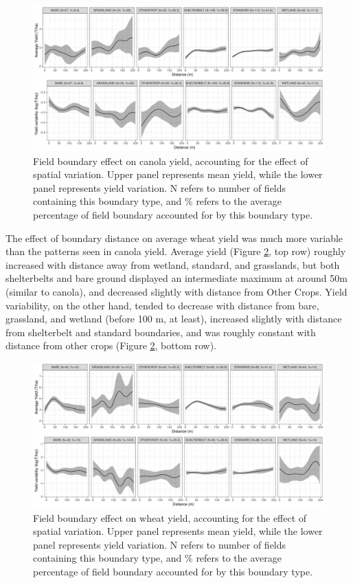 \documentclass[]{elsarticle} %
\begin{document}
\begin{figure}
\includegraphics[width=1\linewidth]{../Figures/ModelSummary3a_canola} \caption{Field boundary effect on canola yield, accounting for the effect of spatial variation. Upper panel represents mean yield, while the lower panel represents yield variation. N refers to number of fields containing this boundary type, and \% refers to the average percentage of field boundary accounted for by this boundary type.}\label{fig:canolaPlot}
\end{figure}

The effect of boundary distance on average wheat yield was much more variable than the patterns seen in canola yield.
Average yield (Figure \ref{fig:wheatPlot}, top row) roughly increased with distance away from wetland, standard, and grasslands, but both shelterbelts and bare ground displayed an intermediate maximum at around 50m (similar to canola), and decreased slightly with distance from Other Crops.
Yield variability, on the other hand, tended to decrease with distance from bare, grassland, and wetland (before 100 m, at least), increased slightly with distance from shelterbelt and standard boundaries, and was roughly constant with distance from other crops (Figure \ref{fig:wheatPlot}, bottom row).

\begin{figure}
\includegraphics[width=1\linewidth]{../Figures/ModelSummary3a_wheat} \caption{Field boundary effect on wheat yield, accounting for the effect of spatial variation. Upper panel represents mean yield, while the lower panel represents yield variation. N refers to number of fields containing this boundary type, and \% refers to the average percentage of field boundary accounted for by this boundary type.}\label{fig:wheatPlot}
\end{figure}
\end{document}
